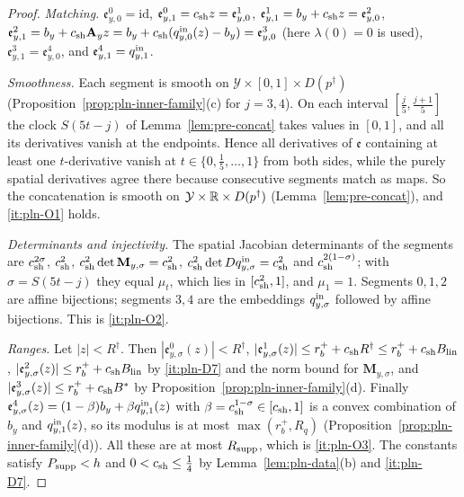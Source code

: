 \begin{proof}
\emph{Matching.} $\mathfrak e^0_{y,0}=\mathrm{id}$, $\mathfrak e^0_{y,1}=c_{\rm sh}z=\mathfrak e^1_{y,0}$, $\mathfrak e^1_{y,1}=b_y+c_{\rm sh}z=\mathfrak e^2_{y,0}$,
$\mathfrak e^2_{y,1}=b_y+c_{\rm sh}\mathbf A_yz=b_y+c_{\rm sh}(q^{\rm in}_{y,0}(z)-b_y)=\mathfrak e^3_{y,0}$ (here $\lambda(0)=0$ is used),
$\mathfrak e^3_{y,1}=\mathfrak e^4_{y,0}$, and $\mathfrak e^4_{y,1}=q^{\rm in}_{y,1}$.

\emph{Smoothness.} Each segment is smooth on $\mathcal Y\times[0,1]\times D(p^\dagger)$ (Proposition~\ref{prop:pln-inner-family}(c)
for $j=3,4$). On each interval $[\frac j5,\frac{j+1}5]$ the clock $S(5t-j)$ of Lemma~\ref{lem:pre-concat} takes values in $[0,1]$, and all its
derivatives vanish at the endpoints. Hence all derivatives of $\mathfrak e$ containing at least one $t$-derivative vanish
at $t\in\{0,\frac15,\dots,1\}$ from both sides, while the purely spatial derivatives agree there because consecutive
segments match as maps. So the concatenation is smooth on $\mathcal Y\times\mathbb{R}\times D(p^\dagger)$
(Lemma~\ref{lem:pre-concat}), and \ref{it:pln-O1} holds.

\emph{Determinants and injectivity.} The spatial Jacobian determinants of the segments are $c_{\rm sh}^{2\sigma}$, $c_{\rm sh}^2$,
$c_{\rm sh}^2\det\mathbf M_{y,\sigma}=c_{\rm sh}^2$, $c_{\rm sh}^2\det Dq^{\rm in}_{y,\sigma}=c_{\rm sh}^2$ and $c_{\rm sh}^{2(1-\sigma)}$; with $\sigma=S(5t-j)$ they equal
$\mu_t$, which lies in $[c_{\rm sh}^2,1]$, and $\mu_1=1$. Segments $0,1,2$ are affine bijections; segments $3,4$ are the
embeddings $q^{\rm in}_{y,\sigma}$ followed by affine bijections. This is \ref{it:pln-O2}.

\emph{Ranges.} Let $|z|<R^\dagger$. Then $|\mathfrak e^0_{y,\sigma}(z)|<R^\dagger$, $|\mathfrak e^1_{y,\sigma}(z)|\le r_b^++c_{\rm sh}R^\dagger\le r_b^++c_{\rm sh}B_{\rm lin}$,
$|\mathfrak e^2_{y,\sigma}(z)|\le r_b^++c_{\rm sh}B_{\rm lin}$ by \ref{it:pln-D7} and the norm bound for $\mathbf M_{y,\sigma}$, and
$|\mathfrak e^3_{y,\sigma}(z)|\le r_b^++c_{\rm sh}B^*$ by Proposition~\ref{prop:pln-inner-family}(d). Finally
$\mathfrak e^4_{y,\sigma}(z)=(1-\beta)b_y+\beta q^{\rm in}_{y,1}(z)$ with $\beta=c_{\rm sh}^{1-\sigma}\in[c_{\rm sh},1]$ is a convex combination of $b_y$ and
$q^{\rm in}_{y,1}(z)$, so its modulus is at most $\max(r_b^+,R_q)$ (Proposition~\ref{prop:pln-inner-family}(d)). All these are
at most $R_{\rm supp}$, which is \ref{it:pln-O3}. The constants satisfy $P_{\rm supp}<h$ and $0<c_{\rm sh}\le\frac14$ by
Lemma~\ref{lem:pln-data}(b) and \ref{it:pln-D7}.
\end{proof}

